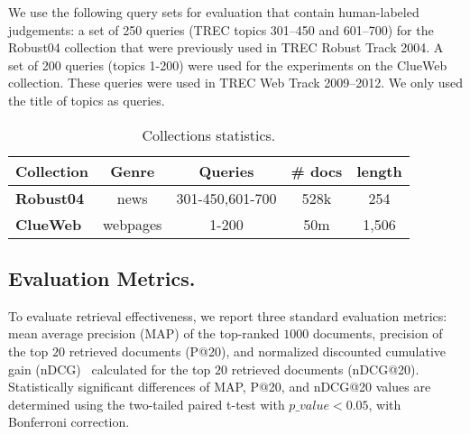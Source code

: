 \documentclass[sigconf]{acmart}
\begin{document}
We use the following query sets for evaluation that contain human-labeled judgements: a set of 250 queries (TREC topics 301--450 and 601--700) for the Robust04 collection that were previously used in TREC Robust Track 2004. A set of 200 queries (topics 1-200) were used for the experiments on the ClueWeb collection. These queries were used in TREC Web Track 2009--2012. We only used the title of topics as queries.

\begin{table}
\centering
\caption{Collections statistics.}
\vspace{-10pt}
\begin{tabularx}{\linewidth}{Xcccc} 
\toprule
\bf Collection & \bf Genre & \bf Queries & \bf \# docs & \bf length  \\ \midrule
\bf Robust04 & news  & 301-450,601-700 & 528k & 254  \\ \bf ClueWeb & webpages & 1-200 & 50m & 1,506  \\ 
\bottomrule
\end{tabularx}
\label{tab:data}
\vspace{-15pt}
\end{table} 
\subsection{Evaluation Metrics.}
To evaluate retrieval effectiveness, we report three standard evaluation metrics: mean average precision (MAP) of the top-ranked $1000$ documents, precision of the top $20$ retrieved documents (P@20), and normalized discounted cumulative gain (nDCG)~\citep{Jarvelin:2002} calculated for the top $20$ retrieved documents (nDCG@20). Statistically significant differences of MAP, P@20, and nDCG@20 values are determined using the two-tailed paired t-test with $p\_value<0.05$, with Bonferroni correction.
\newcommand{\ps}{$^\blacktriangleup$}
\newcommand{\ns}{$^\smalltriangledown$}
\newcommand{\fs}{$^{~}$}
\end{document}
